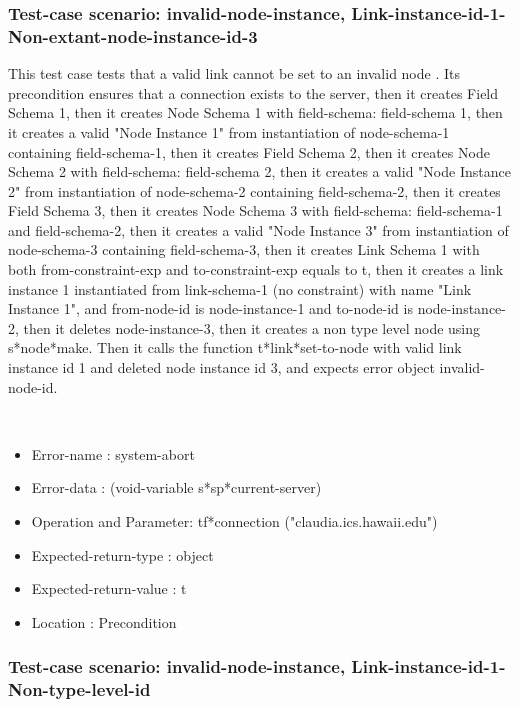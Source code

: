 \subsubsection {Test-case scenario: invalid-node-instance, Link-instance-id-1-Non-extant-node-instance-id-3}


This test case tests that a valid link cannot be set to an invalid node .
Its precondition ensures that a connection exists to the server, then it creates Field Schema 1, then it creates Node Schema 1 with field-schema: field-schema 1, then it creates a valid "Node Instance 1" from instantiation of node-schema-1 containing field-schema-1, then it creates Field Schema 2, then it creates Node Schema 2 with field-schema: field-schema 2, then it creates a valid "Node Instance 2" from instantiation of node-schema-2 containing field-schema-2, then it creates Field Schema 3, then it creates Node Schema 3 with field-schema: field-schema-1 and field-schema-2, then it creates a valid "Node Instance 3" from instantiation of node-schema-3 containing field-schema-3, then it creates Link Schema 1 with both from-constraint-exp and to-constraint-exp equals to t, then it creates a link instance 1 instantiated from  link-schema-1 (no constraint) with name "Link Instance 1", and from-node-id is node-instance-1 and to-node-id is node-instance-2, then it deletes node-instance-3, then it creates a non type level node using s*node*make.
Then it calls the function t*link*set-to-node  with  valid link instance id 1 and deleted node instance id 3, and expects error object invalid-node-id.



\
\begin {itemize}
\item 	Error-name             : system-abort
\item Error-data             : (void-variable s*sp*current-server)
\item Operation and Parameter: tf*connection ("claudia.ics.hawaii.edu")
\item Expected-return-type   : object
\item Expected-return-value  : t
\item Location               : Precondition



\end {itemize}
\subsubsection {Test-case scenario: invalid-node-instance, Link-instance-id-1-Non-type-level-id}


